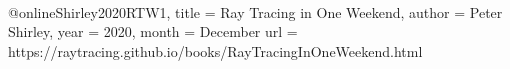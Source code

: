 \usepackage{biblatex}

~\cite{Shirley2020RTW1}

@online{Shirley2020RTW1,
   title = {Ray Tracing in One Weekend},
   author = {Peter Shirley},
   year = {2020},
   month = {December}
   url = {https://raytracing.github.io/books/RayTracingInOneWeekend.html}
}